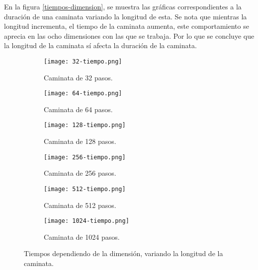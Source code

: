 \documentclass[12pt,letterpaper]{article}
\begin{document}
 En la figura \ref{tiempos-dimension}, se muestra las gráficas correspondientes a la duración de una caminata variando la longitud de esta. Se nota que mientras la longitud incrementa, el tiempo de la caminata aumenta, este comportamiento se aprecia en las ocho dimensiones con las que se trabaja. Por lo que se concluye que la longitud de la caminata sí afecta la duración de la caminata.
 
 
  \begin{figure}
 	\centering
 	\begin{subfigure}[b]{0.45\linewidth}
 		\texttt{[image: 32-tiempo.png]}
 		 \caption{Caminata de 32 pasos.}
 		\label{32tiempo}
 	\end{subfigure}
 	\begin{subfigure}[b]{0.45\linewidth}
 		\texttt{[image: 64-tiempo.png]}
 		 \caption{Caminata de 64 pasos.}
 		\label{64tiempo}
 	\end{subfigure}
 	\begin{subfigure}[b]{0.45\linewidth}
 		\texttt{[image: 128-tiempo.png]}
 		\caption{Caminata de 128 pasos.}
 		\label{128tiempo}
 	\end{subfigure}
	\begin{subfigure}[b]{0.45\linewidth}
 		\texttt{[image: 256-tiempo.png]}
 		 \caption{Caminata de 256 pasos.}
 		\label{256tiempo}
 	\end{subfigure}
 		\begin{subfigure}[b]{0.45\linewidth}
 		\texttt{[image: 512-tiempo.png]}
 		 \caption{Caminata de 512 pasos.}
 		\label{512tiempo}
 	\end{subfigure}
 		\begin{subfigure}[b]{0.45\linewidth}
 		\texttt{[image: 1024-tiempo.png]}
 		\caption{Caminata de 1024 pasos.}
 		\label{1024tiempo}
 		\end{subfigure}
 		 	\caption{Tiempos dependiendo de la dimensión, variando la longitud de la caminata.} 
\label{tiempo-largos}
 \end{figure}
 
\end{document}
